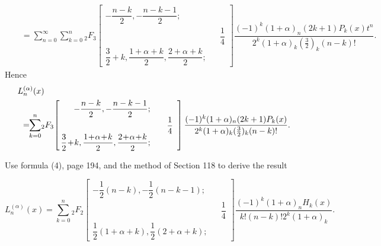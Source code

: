 \begin{solution}
\begin{eqnarray*}
&& \!\!=\!\!\displaystyle\sum_{n=0}^{\infty} \displaystyle\sum_{k=0}^n \!{}_2F_3\!\! \left[ \begin{array}{rlr}
- \dfrac{n-k}{2}, -\dfrac{n-k-1}{2}; & & \\
& & \dfrac{1}{4} \\
\!\!\dfrac{3}{2}\!+\!k,\! \dfrac{1\!+\!\alpha\!+\!k}{2},\!\dfrac{2\!+\!\alpha\!+\!k}{2}; & & 
\end{array} \right] \dfrac{(-1)^k (1+\alpha)_n (2k+1)P_k(x)t^n}{2^k (1+\alpha)_k (\frac{3}{2})_k (n-k)!}.
\end{eqnarray*}
Hence
\begin{eqnarray*}
\lefteqn{L_n^{(\alpha)}(x)} \\
&&\!\!=\!\!\displaystyle\sum_{k=0}^n\! {}_2F_3\! \left[ \begin{array}{rlr}
-\dfrac{n-k}{2}, - \dfrac{n-k-1}{2}; & & \\
& & \dfrac{1}{4} \\
\!\!\dfrac{3}{2}\!+\!k, \dfrac{1\!+\!\alpha\!+\!k}{2}, \dfrac{2\!+\!\alpha\!+\!k}{2}; & &
\end{array} \right] \dfrac{(-1)^k (1+\alpha)_n (2k+1) P_k(x)}{2^k (1+\alpha)_k (\frac{3}{2})_k (n-k)!}.
\end{eqnarray*}
\end{solution}
\begin{problem}\label{problem3chapter12}
Use formula (4), page 194, and the method of Section 118 to derive the result

$$L_n^{(\alpha)}(x) = \displaystyle\sum_{k=0}^n {}_2F_2 \left[ \begin{array}{rlr}
-\dfrac{1}{2}(n-k), -\dfrac{1}{2}(n-k-1); & & \\
& & \dfrac{1}{4} \\
\dfrac{1}{2}(1 + \alpha + k), \dfrac{1}{2}(2+\alpha+k); & &
\end{array} \right] \dfrac{(-1)^k (1+ \alpha)_n H_k(x)}{k! (n-k)! 2^k (1+\alpha)_k}.$$
\end{problem}
